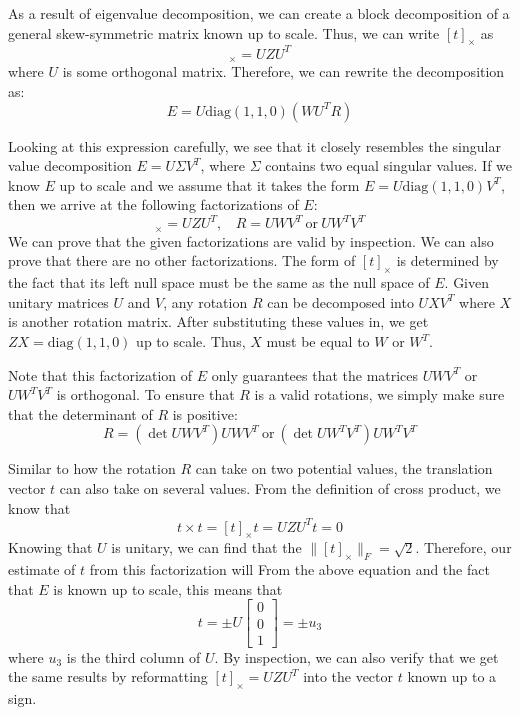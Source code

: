 \documentclass[a4paper, 12pt]{article}
\numberwithin{equation}{section}
\begin{document}
As a result of eigenvalue decomposition, we can create a block decomposition of a general skew-symmetric matrix known up to scale. Thus, we can write $[t]_\times$ as 
\begin{equation}
    [t]_\times  = UZU^T
\end{equation}
where $U$ is some orthogonal matrix. Therefore, we can rewrite the decomposition as:
\begin{equation}
    E = U\mathrm{diag}(1,1,0)  (WU^TR)
\end{equation}

Looking at this expression carefully, we see that it closely resembles the singular value decomposition $E = U\Sigma V^T$, where $\Sigma$ contains two equal singular values. If we know $E$ up to scale and we assume that it takes the form $E = U \mathrm{diag}(1,1,0)V^T$, then we arrive at the following factorizations of $E$:
\begin{equation}
    [t]_\times  = UZU^T, ~~~~ R= UWV^T ~ \mathrm{or} ~ UW^TV^T
\end{equation}
We can prove that the given factorizations are valid by inspection. We can also prove that there are no other factorizations. The form of $[t]_\times$ is determined by the fact that its left null space must be the same as the null space of $E$. Given unitary matrices $U$ and $V$, any rotation $R$ can be decomposed into $UXV^T$ where $X$ is another rotation matrix. After substituting these values in, we get $ZX = \mathrm{diag}(1,1,0)$ up to scale. Thus, $X$ must be equal to $W$ or $W^T$. 

Note that this factorization of $E$ only guarantees that the matrices $UWV^T$ or $UW^TV^T$ is orthogonal. To ensure that $R$ is a valid rotations, we simply make sure that the determinant of $R$ is positive:
\begin{equation}
    R= (\det UWV^T)UWV^T ~ \mathrm{or} ~ (\det UW^TV^T)UW^TV^T
\end{equation}

Similar to how the rotation $R$ can take on two potential values, the translation vector $t$ can also take on several values. From the definition of cross product, we know that
\begin{equation}
    t \times t = [t]_\times t = UZU^T t = 0
\end{equation}
Knowing that $U$ is unitary, we can find that the $\|[t]_\times\|_F = \sqrt{2}$. Therefore, our estimate of $t$ from this factorization will From the above equation and the fact that $E$ is known up to scale, this means that 
\begin{equation}
    t = \pm U\begin{bmatrix}0\\0\\1\end{bmatrix} = \pm u_3
\end{equation}
where $u_3$ is the third column of $U$. By inspection, we can also verify that we get the same results by reformatting $[t]_\times = UZU^T$ into the vector $t$ known up to a sign.
\end{document}
